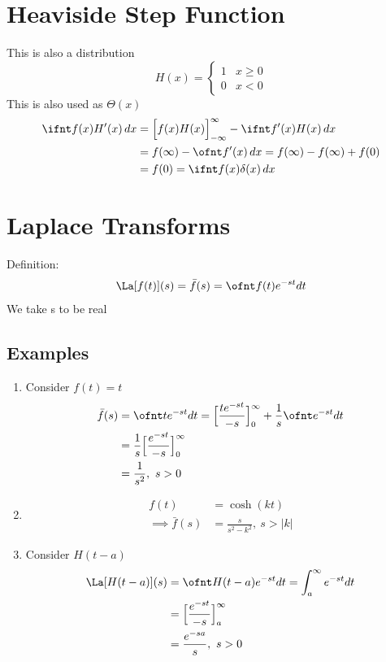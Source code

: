\documentclass[a4paper, 11pt, normalem]{report}
\begin{document}
\section{Heaviside Step Function}
This is also a distribution
\begin{equation*}
    H(x) =
    \begin{cases}
        1 & x \geq 0 \\
        0 & x < 0
    \end{cases}
\end{equation*}
This is also used as $\Theta(x)$
\begin{align*}
    \ifnt f(x)H'(x)\,dx &= \Big[f(x)H(x)\Big]_{-\infty}^{\infty} - \ifnt f'(x)H(x)\,dx \\
    &= f(\infty) - \ofnt f'(x)\,dx = f(\infty) - f(\infty) + f(0) \\
    &= f(0) = \ifnt f(x)\delta(x)\,dx
\end{align*}

\section{Laplace Transforms}
Definition:
\begin{equation*}
    \La[f(t)](s) = \bar{f}(s) = \ofnt f(t)e^{-st}dt
\end{equation*}
We take s to be real

\subsection{Examples}
\begin{enumerate}
    \item Consider $f(t) = t$
            \begin{align*}
                \bar{f}(s) &= \ofnt te^{-st}dt = \Big[\frac{te^{-st}}{-s}\Big]_{0}^{\infty} + \frac{1}{s} \ofnt e^{-st}dt \\
                &= \frac{1}{s} \Big[\frac{e^{-st}}{-s}\Big]_{0}^{\infty} \\
                &= \frac{1}{s^2},~ s > 0
            \end{align*}
    \item   \begin{align*}
                f(t) &= \cosh(kt) \\
                \implies \bar{f}(s) &= \frac{s}{s^2 - k^2},~ s > |k|
            \end{align*}
    \item Consider $H(t - a)$
            \begin{align*}
                \La[H(t - a)](s) &= \ofnt H(t - a)e^{-st}dt = \int_{a}^{\infty} e^{-st}dt \\
                &= \Big[\frac{e^{-st}}{-s}\Big]_{a}^{\infty} \\
                &= \frac{e^{-sa}}{s},~ s > 0
            \end{align*}
\end{enumerate}
\end{document}
